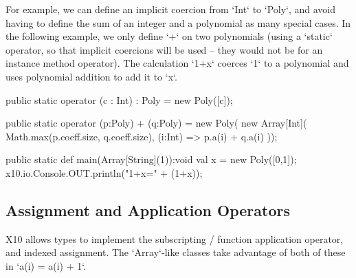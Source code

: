 For example, we can define an implicit coercion from \xcd`Int` to \xcd`Poly`,
and avoid having to define the sum of an integer and a polynomial
as many special cases.  In the following example, we only define \xcd`+` on
two polynomials (using a \xcd`static` operator, so that implicit coercions
will be used -- they would not be for an instance method operator).  The
calculation \xcd`1+x` coerces \xcd`1` to a polynomial and uses polynomial
addition to add it to \xcd`x`.


\begin{xten}
  public static operator (c : Int) : Poly = new Poly([c]);

  public static operator (p:Poly) + (q:Poly) = new Poly(
      new Array[Int](
        Math.max(p.coeff.size, q.coeff.size),
        (i:Int) => p.a(i) + q.a(i)
     ));

  public static def main(Array[String](1)):void {
     val x = new Poly([0,1]);
     x10.io.Console.OUT.println("1+x=" + (1+x));
  }
\end{xten}


\subsection{Assignment and Application Operators}
\index{()}
\index{()=}
\label{set-and-apply}
X10 allows types to implement the subscripting / function application
operator, and indexed assignment.  The \xcd`Array`-like classes take advantage
of both of these in \xcd`a(i) = a(i) + 1`.  

